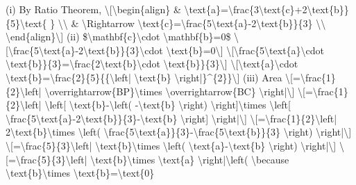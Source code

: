 \item (i) By Ratio Theorem, \textbackslash{[}\textbackslash begin\{align\}
\& \textbackslash text\{a\}=\textbackslash frac\{3\textbackslash text\{c\}+2\textbackslash text\{b\}\}\{5\}\textbackslash text\{
\} \textbackslash\textbackslash{} \& \textbackslash Rightarrow
\textbackslash text\{c\}=\textbackslash frac\{5\textbackslash text\{a\}-2\textbackslash text\{b\}\}\{3\}
\textbackslash\textbackslash{} \textbackslash end\{align\}\textbackslash{]}
(ii) \$\textbackslash mathbf\{c\}\textbackslash cdot \textbackslash mathbf\{b\}=0\$
\textbackslash{[}\textbackslash frac\{5\textbackslash text\{a\}-2\textbackslash text\{b\}\}\{3\}\textbackslash cdot
\textbackslash text\{b\}=0\textbackslash{]} \textbackslash{[}\textbackslash frac\{5\textbackslash text\{a\}\textbackslash cdot
\textbackslash text\{b\}\}\{3\}=\textbackslash frac\{2\textbackslash text\{b\}\textbackslash cdot
\textbackslash text\{b\}\}\{3\}\textbackslash{]} \textbackslash{[}\textbackslash text\{a\}\textbackslash cdot
\textbackslash text\{b\}=\textbackslash frac\{2\}\{5\}\{\{\textbackslash left|
\textbackslash text\{b\} \textbackslash right|\}\textasciicircum\{2\}\}\textbackslash{]}
(iii) Area \textbackslash{[}=\textbackslash frac\{1\}\{2\}\textbackslash left|
\textbackslash overrightarrow\{BP\}\textbackslash times \textbackslash overrightarrow\{BC\}
\textbackslash right|\textbackslash{]} \textbackslash{[}=\textbackslash frac\{1\}\{2\}\textbackslash left|
\textbackslash left{[} \textbackslash text\{b\}-\textbackslash left(
-\textbackslash text\{b\} \textbackslash right) \textbackslash right{]}\textbackslash times
\textbackslash left{[} \textbackslash frac\{5\textbackslash text\{a\}-2\textbackslash text\{b\}\}\{3\}-\textbackslash text\{b\}
\textbackslash right{]} \textbackslash right|\textbackslash{]}
\textbackslash{[}=\textbackslash frac\{1\}\{2\}\textbackslash left|
2\textbackslash text\{b\}\textbackslash times \textbackslash left(
\textbackslash frac\{5\textbackslash text\{a\}\}\{3\}-\textbackslash frac\{5\textbackslash text\{b\}\}\{3\}
\textbackslash right) \textbackslash right|\textbackslash{]} \textbackslash{[}=\textbackslash frac\{5\}\{3\}\textbackslash left|
\textbackslash text\{b\}\textbackslash times \textbackslash left(
\textbackslash text\{a\}-\textbackslash text\{b\} \textbackslash right)
\textbackslash right|\textbackslash{]} \textbackslash{[}=\textbackslash frac\{5\}\{3\}\textbackslash left|
\textbackslash text\{b\}\textbackslash times \textbackslash text\{a\}
\textbackslash right|\textbackslash left( \textbackslash because
\textbackslash text\{b\}\textbackslash times \textbackslash text\{b\}=\textbackslash text\{0\}

